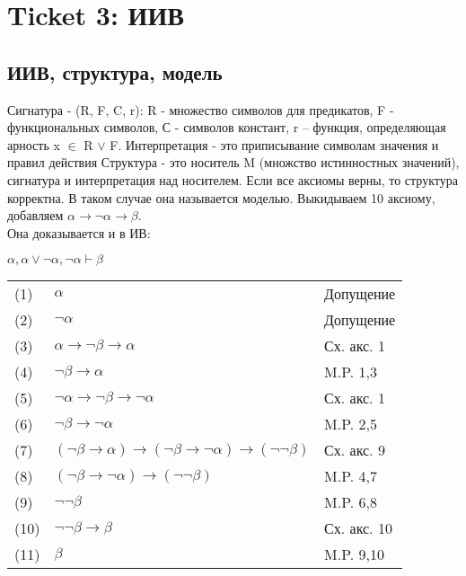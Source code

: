 \section{Ticket 3: ИИВ}
\label{sec-5}
\subsection{ИИВ, структура, модель}
\label{sec-5-1}
Сигнатура - (R, F, C, r): R - множество символов для предикатов, F - функциональных символов, С - символов констант, r – функция, определяющая арность x $\in$ R $\vee$ F. Интерпретация - это приписывание символам значения и правил действия Структура - это носитель M (множство истинностных значений), сигнатура и интерпретация над носителем. Если все аксиомы верны, то структура корректна. В таком случае она называется моделью. Выкидываем 10 аксиому, добавляем $\alpha \rightarrow \neg \alpha \rightarrow \beta$.\\
Она доказывается и в ИВ:
\begin{lemma}
$\alpha, \alpha \vee \neg \alpha, \neg \alpha \vdash \beta$
\end{lemma}
\begin{tabular}{lll}
(1) & $\alpha$& Допущение\\
(2) & $\neg \alpha$& Допущение\\
(3) & $\alpha \rightarrow \neg \beta \rightarrow \alpha$& Сх. акс. 1\\
(4) & $\neg \beta \rightarrow \alpha$& M.P. 1,3\\
(5) & $\neg \alpha \rightarrow \neg \beta \rightarrow \neg \alpha$& Сх. акс. 1\\
(6) & $\neg \beta \rightarrow \neg \alpha$& M.P. 2,5\\
(7) & $(\neg \beta \rightarrow \alpha) \rightarrow (\neg \beta \rightarrow \neg \alpha) \rightarrow (\neg \neg \beta)$& Сх. акс. 9\\
(8) & $(\neg \beta \rightarrow \neg \alpha) \rightarrow (\neg \neg \beta)$& M.P. 4,7\\
(9) & $\neg \neg \beta$& M.P. 6,8\\
(10) & $\neg \neg \beta \rightarrow \beta$& Сх. акс. 10\\
(11) & $\beta$& M.P. 9,10\\
\end{tabular}


